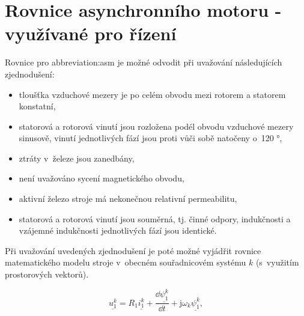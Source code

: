 \documentclass[a4paper, twoside, 11pt]{article}
\begin{document}


\tableofcontents
\newpage%
\flushbottom %
\newpage
\vspace{0pt}
\listoffigures %
\flushbottom %
\newpage
\listoftables
\flushbottom
\newpage


\null\newpage
\setcounter{page}{1}

\section{Rovnice asynchronního motoru - využívané pro řízení}
Rovnice pro \gls{abbreviation:asm} je možné odvodit při uvažování následujících zjednodušení:

\begin{itemize}
    \item tloušťka vzduchové mezery je po celém obvodu mezi rotorem a statorem konstatní,
    \item statorová a rotorová vinutí jsou rozložena podél obvodu vzduchové mezery sinusově, vinutí jednotlivých fází jsou proti vůči sobě natočeny o~120 °,
    \item ztráty v~železe jsou zanedbány,
    \item není uvažováno sycení magnetického obvodu,
    \item aktivní železo stroje má nekonečnou relativní permeabilitu,
    \item statorová a rotorová vinutí jsou souměrná, tj. činné odpory, indukčnosti a vzájemné indukčnosti jednotlivých fází jsou identické.
\end{itemize}

Při uvažování uvedených zjednodušení je poté možné vyjádřit rovnice matematického modelu stroje v~obecném souřadnicovém systému $k$ (s~využitím prostorových vektorů).

 \begin{equation}
     \underline{u_{1}^{k}} = R_1 \underline{i_1^{k}} + \frac{\dd{\underline{\psi_1^{k}}}}{\dd{t}} + \text{j} \omega_k \underline{\psi_1^{k}},
    \end{equation}
\end{document}
